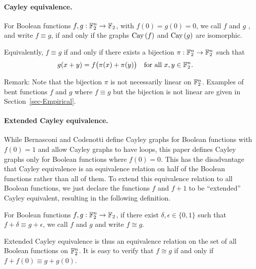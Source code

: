 \paragraph*{Cayley equivalence.}
\begin{Definition}
%
For Boolean functions $f, g : \mathbb{F}_2^n \rightarrow \mathbb{F}_2$, with $f(0)=g(0)=0$,
we call $f$ and $g$ ,
and write $f \equiv g$,
if and only if the graphs $\operatorname{Cay}\left(f\right)$ and $\operatorname{Cay}\left(g\right)$ are isomorphic.

Equivalently, $f \equiv g$ if and only if
there exists a bijection $\pi : \mathbb{F}_2^n \rightarrow \mathbb{F}_2^n$ such that
\begin{align*}
g(x+y) &= f \big(\pi(x)+\pi(y)\big) \quad \text{for all~} x,y \in \mathbb{F}_2^n.
\end{align*}
\end{Definition}
Remark: Note that the bijection $\pi$ is not necessarily linear on $\mathbb{F}_2^n$.
Examples of bent functions $f$ and $g$ where $f \equiv g$ but the bijection is not linear
are given in Section~\ref{sec-Empirical}.
\paragraph*{Extended Cayley equivalence.}
%
While Bernasconi and Codenotti \cite{BerC99} define Cayley graphs for Boolean functions with
$f(0)=1$ and allow Cayley graphs to have loops, this paper defines Cayley
graphs only for Boolean functions where $f(0)=0$.
This has the disadvantage that Cayley equivalence is an equivalence relation on half
of the Boolean functions rather than all of them.
To extend this equivalence relation to all Boolean functions,
we just declare the functions $f$ and $f+1$ to be ``extended'' Cayley equivalent,
resulting in the following definition.
\begin{Definition}
For Boolean functions $f, g : \mathbb{F}_2^n \rightarrow \mathbb{F}_2$,
if there exist $\delta, \epsilon \in \{0,1\}$ such that $f + \delta \equiv g + \epsilon$,
we call $f$ and $g$  and write $f \cong g$.
\end{Definition}
Extended Cayley equivalence is thus an equivalence relation on the set of all Boolean functions on
$\mathbb{F}_2^n$.
It is easy to verify that $f \cong g$ if and only if $f+f(0) \equiv g+g(0)$.


